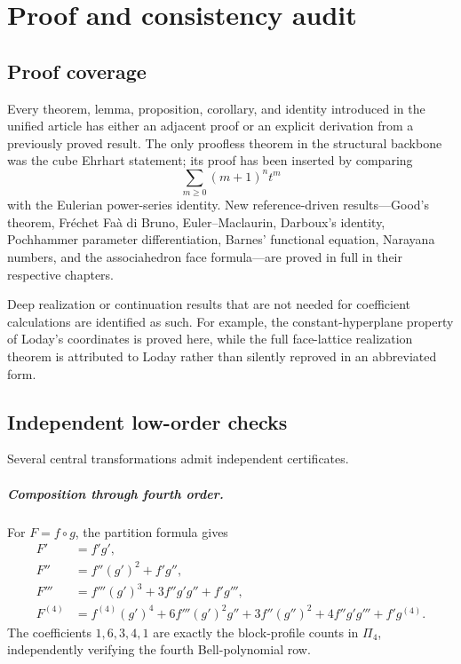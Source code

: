 \documentclass[11pt,a4paper,oneside,openany]{book}
\theoremstyle{definition}
\theoremstyle{remark}
\begin{document}
\chapter{Proof and consistency audit}

\section{Proof coverage}

Every theorem, lemma, proposition, corollary, and identity introduced in the
unified article has either an adjacent proof or an explicit derivation from a
previously proved result. The only proofless theorem in the structural backbone
was the cube Ehrhart statement; its proof has been inserted by comparing
\[
 \sum_{m\ge0}(m+1)^nt^m
\]
with the Eulerian power-series identity. New reference-driven results---Good's
theorem, Fr\'echet Fa\`a di Bruno, Euler--Maclaurin, Darboux's identity,
Pochhammer parameter differentiation, Barnes' functional equation, Narayana
numbers, and the associahedron face formula---are proved in full in their
respective chapters.

Deep realization or continuation results that are not needed for coefficient
calculations are identified as such. For example, the constant-hyperplane
property of Loday's coordinates is proved here, while the full face-lattice
realization theorem is attributed to Loday rather than silently reproved in an
abbreviated form.

\section{Independent low-order checks}

Several central transformations admit independent certificates.

\paragraph{Composition through fourth order.}
For $F=f\circ g$, the partition formula gives
\begin{align*}
 F'&=f'g',\\
 F''&=f''(g')^2+f'g'',\\
 F'''&=f'''(g')^3+3f''g'g''+f'g''',\\
 F^{(4)}&=f^{(4)}(g')^4+6f'''(g')^2g''
 +3f''(g'')^2+4f''g'g'''+f'g^{(4)}.
\end{align*}
The coefficients $1,6,3,4,1$ are exactly the block-profile counts in
$\Pi_4$, independently verifying the fourth Bell-polynomial row.
\end{document}
